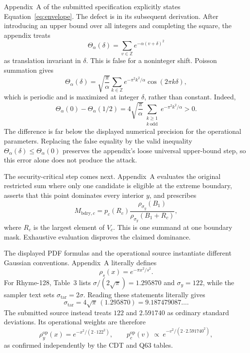 \documentclass[11pt,a4paper]{article}
\newcommand{\Z}{\mathbb{Z}}
\begin{document}
Appendix~A of the submitted specification explicitly states
Equation~\eqref{eq:envelope}.  The defect is in its subsequent derivation.
After introducing an upper bound over all integers and completing the square,
the appendix treats
\begin{equation}
 \Theta_\alpha(\delta)=\sum_{v\in\Z}e^{-\alpha(v+\delta)^2}
                                                               \label{eq:theta}
\end{equation}
as translation invariant in $\delta$.  This is false for a noninteger shift.
Poisson summation gives
\[
 \Theta_\alpha(\delta)=\sqrt{\frac{\pi}{\alpha}}
 \sum_{k\in\Z}e^{-\pi^2k^2/\alpha}\cos(2\pi k\delta),
\]
which is periodic and is maximized at integer $\delta$, rather than constant.
Indeed,
\[
 \Theta_\alpha(0)-\Theta_\alpha(1/2)
 =4\sqrt{\frac{\pi}{\alpha}}
   \sum_{\substack{k\ge1\\k\ \mathrm{odd}}}e^{-\pi^2k^2/\alpha}>0.
\]
The difference is far below the displayed numerical precision for the
operational parameters.  Replacing the false equality by the valid inequality
$\Theta_\alpha(\delta)\le\Theta_\alpha(0)$ preserves the appendix's loose
universal upper-bound step, so this error alone does not produce the attack.

The security-critical step comes next.  Appendix~A evaluates the original
restricted sum where only one candidate is eligible at the extreme boundary,
asserts that this point dominates every interior $y$, and prescribes
\begin{equation}
 M_{\mathrm{bdry},c}=p_c(R_c)
  \frac{\rho_{\sigma_y}(B_1)}{\rho_{\sigma_y}(B_1+R_c)},
                                                               \label{eq:mbdry}
\end{equation}
where $R_c$ is the largest element of $V_c$.  This is one summand at one
boundary mask.  Exhaustive evaluation disproves the claimed dominance.

The displayed PDF formulas and the operational source instantiate different
Gaussian conventions.  Appendix~A literally defines
\begin{equation}
                  \rho_s(x)=e^{-\pi x^2/s^2}.           \label{eq:pdfgauss}
\end{equation}
For Rhyme-128, Table~3 lists $\sigma/(2\sqrt\pi)=1.295870$ and
$\sigma_y=122$, while the sampler text sets
$\sigma_{\mathrm{tar}}=2\sigma$.  Reading these statements literally gives
\[
 \sigma_{\mathrm{tar}}=4\sqrt\pi\,(1.295870)
       =9.187479087\ldots .
\]
The submitted source instead treats $122$ and $2.591740$ as ordinary standard
deviations.  Its operational weights are therefore
\begin{equation}
 \rho_y^{\mathrm{op}}(x)=e^{-x^2/(2\cdot122^2)},\qquad
 p_c^{\mathrm{op}}(v)\ \propto\ e^{-v^2/(2\cdot2.591740^2)},
                                                               \label{eq:opgauss}
\end{equation}
as confirmed independently by the CDT and Q63 tables.
\end{document}
